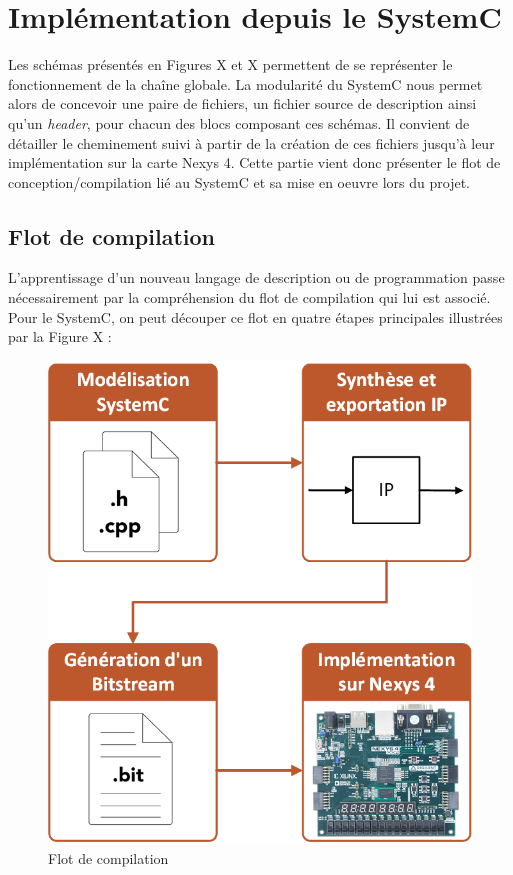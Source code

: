 \documentclass[a4paper,12pt]{article}
\begin{document}
\section{Implémentation depuis le SystemC}
	Les schémas présentés en Figures X et X permettent de se représenter le fonctionnement de la chaîne globale. La modularité du SystemC nous permet alors de concevoir une paire de fichiers, un fichier source de description ainsi qu'un \textit{header}, pour chacun des blocs composant ces schémas. Il convient de détailler le cheminement suivi à partir de la création de ces fichiers jusqu'à leur implémentation sur la carte Nexys 4. Cette partie vient donc présenter le flot de conception/compilation lié au SystemC et sa mise en oeuvre lors du projet.

\subsection{Flot de compilation}
	L'apprentissage d'un nouveau langage de description ou de programmation passe nécessairement par la compréhension du flot de compilation qui lui est associé. Pour le SystemC, on peut découper ce flot en quatre étapes principales illustrées par la Figure X :
	\begin{figure}[H]
		\centering
		\includegraphics[scale=0.5, keepaspectratio]{Dessin2.png}
		\caption{Flot de compilation}
	\end{figure}
\end{document}
